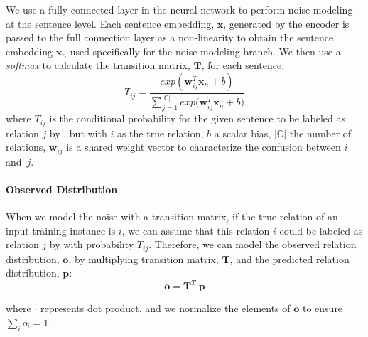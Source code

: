 We use a fully connected layer in the neural network to perform noise
modeling at the sentence level. Each sentence embedding, $\mathbf{x}$,
generated by the encoder is passed to the full connection layer as a  non-linearity to obtain the
sentence embedding $\mathbf{x}_n$ used specifically for the noise modeling
branch.
 We then use a \emph{softmax} to calculate the transition matrix, $\mathbf{T}$, for each sentence:
%
\begin{equation}\label{eq_tm}
T_{ij} = \frac{exp({\mathbf{w}_{ij}^T \mathbf{x}_n + b})}{\sum_{j=1}^{|\mathbb{C}|}{exp({\mathbf{w}_{ij}^T \mathbf{x}_n + b}})}
\end{equation}
where $T_{ij}$ is the conditional probability for the given sentence to be labeled as relation $j$ by \DS, but with $i$ as the true relation, $b$ a scalar bias,  $|\mathbb{C}|$ the number of relations, $\mathbf{w}_{ij}$ is a shared weight vector to characterize the confusion between $i$ and~$j$. %





\paragraph{Observed Distribution}
When we model the noise with a transition matrix,
if the true relation of an input training instance is $i$, we can assume that this relation $i$ could be labeled as relation $j$ by \DS  with probability $T_{ij}$. Therefore, we can model the observed relation distribution, $\mathbf{o}$, by
multiplying transition matrix, $\mathbf{T}$, and the predicted relation distribution, $\mathbf{p}$:
 \begin{equation}
\mathbf{o} = \mathbf{T}^T \bm\cdot \mathbf{p}
\label{eq_transition}
 \end{equation}

where $\bm\cdot$ represents dot product, and we normalize the elements of $\mathbf{o}$ to ensure $\sum_i{o_i}=1$.

